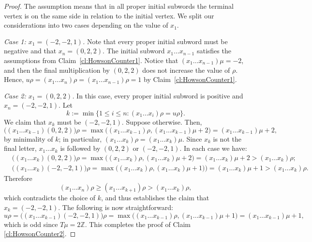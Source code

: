 \documentclass[10pt,a4paper]{amsart}
\begin{document}
\begin{proof}
The assumption means that in all proper initial subwords the terminal vertex is on the same side in 
relation to the initial vertex. We split our considerations into two cases depending on the value of $x_1$.

\emph{Case 1: $x_1 = (-2, -2, 1)$.} Note that every proper initial subword must be negative and that $x_n = (0, 2, 2)$. The initial subword $x_1\dots x_{n-1}$ satisfies the assumptions from Claim~\ref{cl:HowsonCounter1}. Notice that $(x_1\dots x_{n-1})\mu = -2$, and then the final multiplication by $(0, 2, 2)$ does not increase the value of $\rho$. Hence, $u\rho = (x_1\dots x_n)\rho = (x_1\dots x_{n-1})\rho = 1$ by Claim~\ref{cl:HowsonCounter1}.

\emph{Case 2: $x_1 = (0, 2, 2)$.} In this case, every proper initial subword is positive and $x_n = (-2, -2, 1)$. Let 
\[
k := \min\{1\leq i \leq n: (x_1\dots x_i)\rho = u\rho\}.
\]
We claim that $x_k$ must be $(-2, -2, 1)$. Suppose otherwise. Then, 
\[
\bigl((x_1\dots x_{k-1})(0, 2, 2)\bigr)\rho = \max\bigl((x_1\dots x_{k-1})\rho, (x_1\dots x_{k-1})\mu + 2\bigr) = (x_1\dots x_{k-1})\mu + 2,
\]
by minimality of $k$; in particular, $(x_1\dots x_k)\rho = (x_1\dots x_k)\mu$. Since $x_k$ is not the final letter, $x_1\dots x_k$ is followed by $(0, 2, 2)$ or $(-2, -2 ,1)$. 
In each case we have:
\begin{align*}
    &\bigl((x_1\dots x_k)(0, 2, 2)\bigr)\rho = \max\bigl((x_1\dots x_k)\rho, (x_1\dots x_k)\mu + 2\bigr) = (x_1\dots x_k)\mu + 2 > (x_1\dots x_k)\rho;\\
    &\bigl((x_1\dots x_k)(-2, -2, 1)\bigr)\rho = \max\bigl((x_1\dots x_k)\rho, (x_1\dots x_k)\mu+1)\bigr) = (x_1\dots x_k)\mu+1>(x_1\dots x_k)\rho.
\end{align*}
Therefore
\[
(x_1\dots x_n)\rho\geq (x_1\dots x_{k+1})\rho> (x_1\dots x_k)\rho,
\]
which contradicts the choice of $k$, and thus establishes the claim that $x_k = (-2, -2, 1)$.  
The following is now straightforward:
\[
u\rho = \bigl((x_1\dots x_{k-1})(-2, -2, 1)\bigr)\rho = \max\bigl((x_1\dots x_{k-1})\rho, (x_1\dots x_{k-1})\mu+1\bigr) = (x_1\dots x_{k-1})\mu + 1,
\]
which is odd since $T\mu = 2\mathbb{Z}$. This completes the proof of Claim \ref{cl:HowsonCounter2}.
\end{proof}
\end{document}
